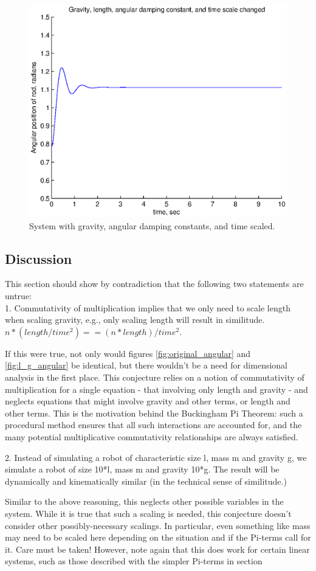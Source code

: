 \documentclass[12pt,letterpaper]{article}
\begin{document}
\begin{figure}[ht]
  \centering
  \includegraphics[width=.48\linewidth]{img/l_g_c_t_angular.eps}
  \caption{System with gravity, angular damping constants, and time scaled. }
  \label{fig:l_g_c_t_angular}
\end{figure}

\subsection{Discussion}

This section should show by contradiction that the following two statements are untrue: \\

1. Commutativity of multiplication implies that we only need to scale length when scaling gravity, e.g., only scaling length will result in similitude.
$n * (length / time^2) == (n * length) / time^2.$

If this were true, not only would figures \ref{fig:original_angular} and \ref{fig:l_g_angular} be identical, but there wouldn't be a need for dimensional analysis in the first place.
This conjecture relies on a notion of commutativity of multiplication for a single equation - that involving only length and gravity - and neglects equations that might involve gravity and other terms, or length and other terms.
This is the motivation behind the Buckingham Pi Theorem: such a procedural method ensures that all such interactions are accounted for, and the many potential multiplicative commutativity relationships are always satisfied.

2. Instead of simulating a robot of characteristic size l, mass m and gravity g, we simulate a robot of size 10*l, mass m and gravity 10*g.
The result will be dynamically and kinematically similar (in the technical sense of similitude.)

Similar to the above reasoning, this neglects other possible variables in the system. 
While it is true that such a scaling is needed, this conjecture doesn't consider other possibly-necessary scalings.
In particular, even something like mass may need to be scaled here depending on the situation and if the Pi-terms call for it.
Care must be taken!
However, note again that this does work for certain linear systems, such as those described with the simpler Pi-terms in section 
\end{document}
